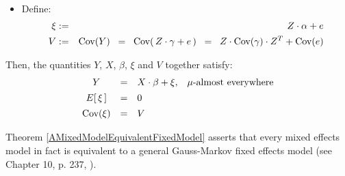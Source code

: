 \begin{theorem}
\begin{itemize}
\begin{equation*}
\begin{array}{ccll}
	\end{array}
	\end{equation*}
\item
	Define:
	\begin{eqnarray*}
	\xi & := & Z \cdot \alpha + e
	\\
	V & := & \textnormal{Cov}(Y) \;\; = \;\; \textnormal{Cov}\!\left(\,Z\cdot\gamma+e\,\right) \;\; = \;\; Z \cdot \textnormal{Cov}(\gamma) \cdot Z^{T} + \textnormal{Cov}(e)
	\end{eqnarray*}
\end{itemize}
Then, the quantities $Y$, $X$, $\beta$, $\xi$ and $V$ together satisfy:
	\begin{equation*}
	\begin{array}{ccll}
	Y & = & X \cdot \beta + \xi, & \textnormal{$\mu$-almost everywhere}
	\\
	E\!\left[\,\xi\,\right] &\overset{{\color{white}\vert}}{=}& 0
	\\
	\Cov\!\left(\xi\right) &\overset{{\color{white}\vert}}{=}& V
	\end{array}
	\end{equation*}
\end{theorem}


\begin{remark}
\mbox{}\vskip 0.0cm \noindent
Theorem \ref{AMixedModelEquivalentFixedModel} asserts that every mixed effects model
in fact is equivalent to a {\color{red}general Gauss-Markov} fixed effects model
(see Chapter 10, p. 237, \cite{Christensen2011}).
\end{remark}


\renewcommand{\theenumi}{\roman{enumi}}
\renewcommand{\labelenumi}{\textnormal{(\theenumi)}$\;\;$}

